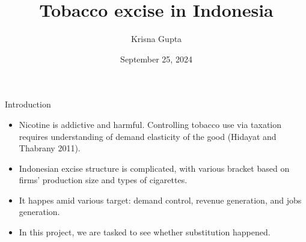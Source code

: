 \documentclass[
  ignorenonframetext,
]{beamer}
\title{Tobacco excise in Indonesia}
\author{Krisna Gupta}
\date{September 25, 2024}
\institute{Center for INdonesian Policy Studies}
\begin{document}
\frame{\titlepage}


\begin{frame}{Introduction}
\label{introduction}
\begin{itemize}
\item
  Nicotine is addictive and harmful. Controlling tobacco use via
  taxation requires understanding of demand elasticity of the good
  (Hidayat and Thabrany 2011).
\item
  Indonesian excise structure is complicated, with various bracket based
  on firms' production size and types of cigarettes.
\item
  It happes amid various target: demand control, revenue generation, and
  jobs generation.
\item
  In this project, we are tasked to see whether substitution happened.
\end{itemize}
\end{frame}
\end{document}
